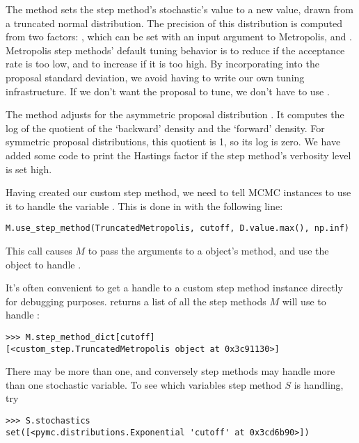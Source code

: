 The  method sets the step method's stochastic's value to a new value, drawn from a truncated normal distribution. The precision of this distribution is computed from two factors: , which can be set with an input argument to Metropolis, and . Metropolis step methods' default tuning behavior is to reduce  if the acceptance rate is too low, and to increase  if it is too high. By incorporating  into the proposal standard deviation, we avoid having to write our own tuning infrastructure. If we don't want the proposal to tune, we don't have to use .

The  method adjusts for the asymmetric proposal distribution \cite{gelman}. It computes the log of the quotient of the `backward' density and the `forward' density. For symmetric proposal distributions, this quotient is 1, so its log is zero. We have added some code to print the Hastings factor if the step method's verbosity level is set high.

\medskip
Having created our custom step method, we need to tell MCMC instances to use it to handle the variable . This is done in  with the following line:
\begin{verbatim}
M.use_step_method(TruncatedMetropolis, cutoff, D.value.max(), np.inf)
\end{verbatim}
This call causes $M$ to pass the arguments  to a  object's  method, and use the object to handle .

\medskip
It's often convenient to get a handle to a custom step method instance directly for debugging purposes.  returns a list of all the step methods $M$ will use to handle :
\begin{verbatim}
>>> M.step_method_dict[cutoff]
[<custom_step.TruncatedMetropolis object at 0x3c91130>]
\end{verbatim}
There may be more than one, and conversely step methods may handle more than one stochastic variable. To see which variables step method $S$ is handling, try
\begin{verbatim}
>>> S.stochastics
set([<pymc.distributions.Exponential 'cutoff' at 0x3cd6b90>])
\end{verbatim}

\hypertarget{user-gen}{}
